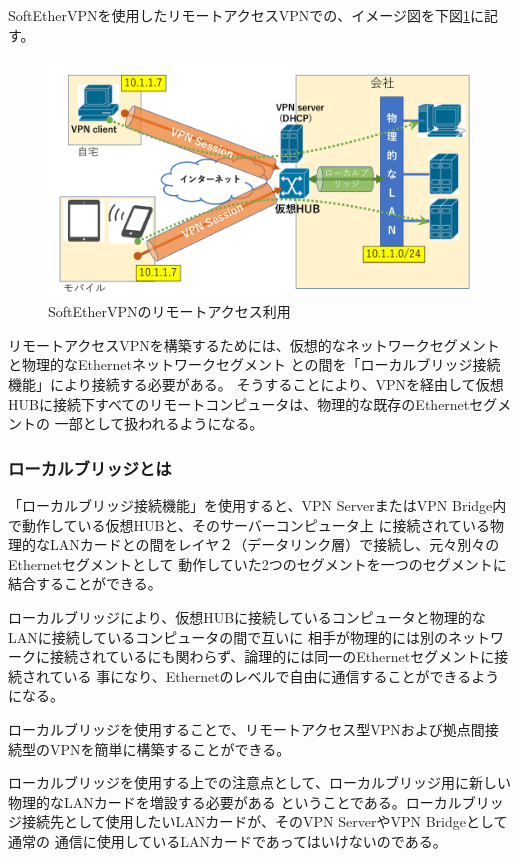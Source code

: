 \documentclass[11pt,a4j,titlepage]{jreport}
\begin{document}
SoftEtherVPNを使用したリモートアクセスVPNでの、イメージ図を下図\ref{remoteaccess}に記す。
\begin{figure}[H]
    \centering
    \includegraphics*[width=1.0\textwidth,page=1]{graphs/softetherVPN.pdf}
    \caption{SoftEtherVPNのリモートアクセス利用}
    \label{remoteaccess}
\end{figure}



リモートアクセスVPNを構築するためには、仮想的なネットワークセグメントと物理的なEthernetネットワークセグメント
との間を「ローカルブリッジ接続機能」により接続する必要がある。
そうすることにより、VPNを経由して仮想HUBに接続下すべてのリモートコンピュータは、物理的な既存のEthernetセグメントの
一部として扱われるようになる。

\subsubsection*{ローカルブリッジとは}
「ローカルブリッジ接続機能」を使用すると、VPN ServerまたはVPN Bridge内で動作している仮想HUBと、そのサーバーコンピュータ上
に接続されている物理的なLANカードとの間をレイヤ２（データリンク層）で接続し、元々別々のEthernetセグメントとして
動作していた2つのセグメントを一つのセグメントに結合することができる。\par
ローカルブリッジにより、仮想HUBに接続しているコンピュータと物理的なLANに接続しているコンピュータの間で互いに
相手が物理的には別のネットワークに接続されているにも関わらず、論理的には同一のEthernetセグメントに接続されている
事になり、Ethernetのレベルで自由に通信することができるようになる。\par
ローカルブリッジを使用することで、リモートアクセス型VPNおよび拠点間接続型のVPNを簡単に構築することができる。\par
ローカルブリッジを使用する上での注意点として、ローカルブリッジ用に新しい物理的なLANカードを増設する必要がある
ということである。ローカルブリッジ接続先として使用したいLANカードが、そのVPN ServerやVPN Bridgeとして通常の
通信に使用しているLANカードであってはいけないのである。
\end{document}
